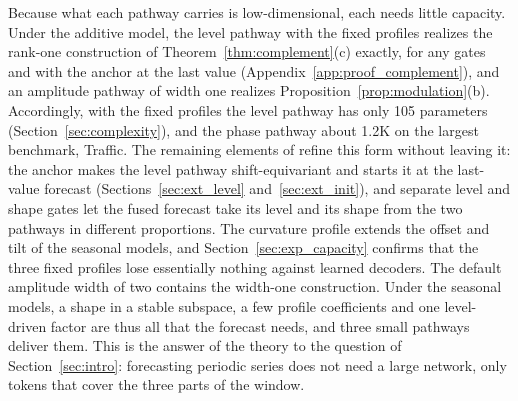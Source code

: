 {
Because what each pathway carries is low-dimensional, each needs little capacity. Under the additive model, the level pathway with the fixed profiles realizes the rank-one construction of Theorem~\ref{thm:complement}(c) exactly, for any gates and with the anchor at the last value (Appendix~\ref{app:proof_complement}), and an amplitude pathway of width one realizes Proposition~\ref{prop:modulation}(b). Accordingly, with the fixed profiles the level pathway has only 105 parameters (Section~\ref{sec:complexity}), and the phase pathway about 1.2K on the largest benchmark, Traffic. The remaining elements of \sysplus refine this form without leaving it: the anchor makes the level pathway shift-equivariant and starts it at the last-value forecast (Sections~\ref{sec:ext_level} and~\ref{sec:ext_init}), and separate level and shape gates let the fused forecast take its level and its shape from the two pathways in different proportions. The curvature profile extends the offset and tilt of the seasonal models, and Section~\ref{sec:exp_capacity} confirms that the three fixed profiles lose essentially nothing against learned decoders. The default amplitude width of two contains the width-one construction. Under the seasonal models, a shape in a stable subspace, a few profile coefficients and one level-driven factor are thus all that the forecast needs, and three small pathways deliver them. This is the answer of the theory to the question of Section~\ref{sec:intro}: forecasting periodic series does not need a large network, only tokens that cover the three parts of the window.
}
